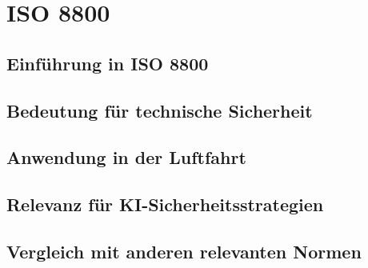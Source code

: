 \part{ISO 8800}
\chapter{Einführung in ISO 8800}

\chapter{Bedeutung für technische Sicherheit}

\chapter{Anwendung in der Luftfahrt}

\chapter{Relevanz für KI-Sicherheitsstrategien}

\chapter{Vergleich mit anderen relevanten Normen}
